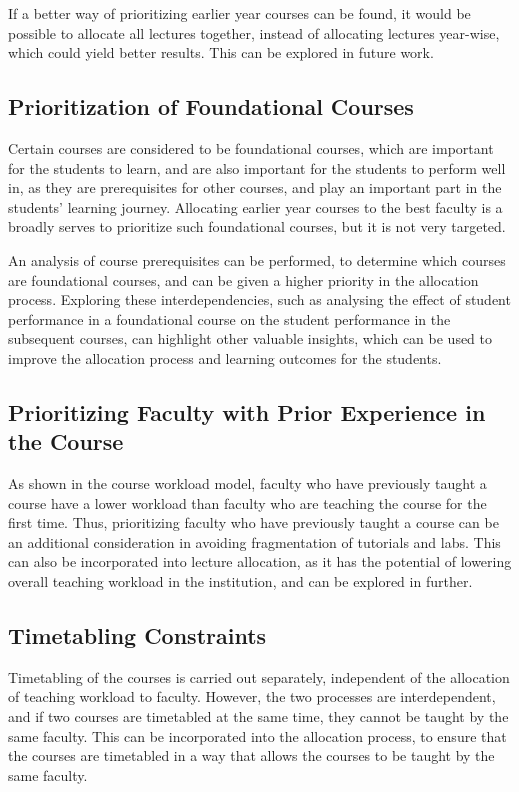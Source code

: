 If a better way of prioritizing earlier year courses can be found, it would be possible to allocate all lectures together, instead of allocating lectures year-wise, which could yield better results. This can be explored in future work.

\subsection{Prioritization of Foundational Courses}

Certain courses are considered to be foundational courses, which are important for the students to learn, and are also important for the students to perform well in, as they are prerequisites for other courses, and play an important part in the students' learning journey. Allocating earlier year courses to the best faculty is a broadly serves to prioritize such foundational courses, but it is not very targeted.

An analysis of course prerequisites can be performed, to determine which courses are foundational courses, and can be given a higher priority in the allocation process. Exploring these interdependencies, such as analysing the effect of student performance in a foundational course on the student performance in the subsequent courses, can highlight other valuable insights, which can be used to improve the allocation process and learning outcomes for the students.

\subsection{Prioritizing Faculty with Prior Experience in the Course}

As shown in the course workload model, faculty who have previously taught a course have a lower workload than faculty who are teaching the course for the first time. Thus, prioritizing faculty who have previously taught a course can be an additional consideration in avoiding fragmentation of tutorials and labs. This can also be incorporated into lecture allocation, as it has the potential of lowering overall teaching workload in the institution, and can be explored in further.

\subsection{Timetabling Constraints}

Timetabling of the courses is carried out separately, independent of the allocation of teaching workload to faculty. However, the two processes are interdependent, and if two courses are timetabled at the same time, they cannot be taught by the same faculty. This can be incorporated into the allocation process, to ensure that the courses are timetabled in a way that allows the courses to be taught by the same faculty.

